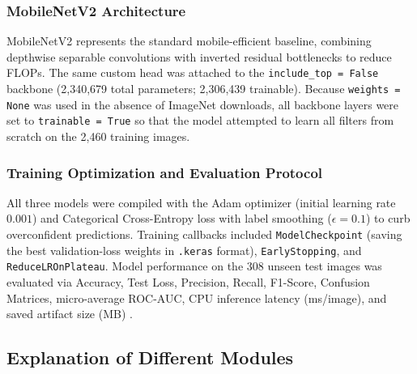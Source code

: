 \subsubsection{MobileNetV2 Architecture}
MobileNetV2 \cite{sandler2018mobilenetv2, howard2017mobilenets} represents the standard mobile-efficient baseline, combining depthwise separable convolutions with inverted residual bottlenecks to reduce FLOPs. The same custom head was attached to the \texttt{include\_top = False} backbone (2,340,679 total parameters; 2,306,439 trainable). Because \texttt{weights = None} was used in the absence of ImageNet downloads, all backbone layers were set to \texttt{trainable = True} so that the model attempted to learn all filters from scratch on the 2,460 training images.

\subsubsection{Training Optimization and Evaluation Protocol}
All three models were compiled with the Adam optimizer (initial learning rate $0.001$) and Categorical Cross-Entropy loss with label smoothing ($\epsilon = 0.1$) to curb overconfident predictions. Training callbacks included \texttt{ModelCheckpoint} (saving the best validation-loss weights in \texttt{.keras} format), \texttt{EarlyStopping}, and \texttt{ReduceLROnPlateau}. Model performance on the 308 unseen test images was evaluated via Accuracy, Test Loss, Precision, Recall, F1-Score, Confusion Matrices, micro-average ROC-AUC, CPU inference latency (ms/image), and saved artifact size (MB) \cite{grandini2020metrics}.

\subsection{Explanation of Different Modules}

